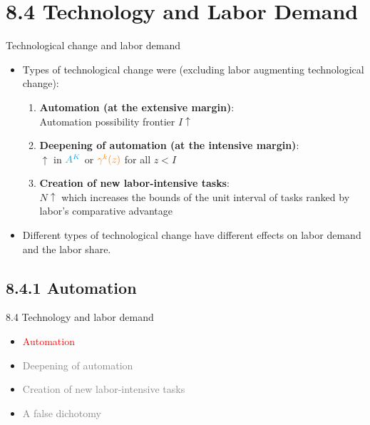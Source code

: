\documentclass[notes=show]{beamer}
\begin{document}
\section{8.4 Technology and Labor Demand}

\begin{frame}{Technological change and labor demand}
\begin{itemize}
\item Types of technological change were (excluding labor augmenting technological change): \medskip
\begin{enumerate}
\item \textbf{Automation (at the extensive margin)}: \\
Automation possibility frontier $I \uparrow $ \medskip
\item \textbf{Deepening of automation (at the intensive margin)}: \\
$\uparrow$ in $\color{cyan} A^{K}$ or $\color{orange} \gamma^{k}(z)$ for all $z < I$ \medskip
\item \textbf{Creation of new labor-intensive tasks}: \\
$N \uparrow $ which increases the bounds of the unit interval of tasks ranked by labor's comparative advantage \smallskip
\end{enumerate}
\item Different types of technological change have different effects on labor demand and the labor share.
\end{itemize}
\end{frame}

\subsection{8.4.1 Automation}

\begin{frame}{8.4 Technology and labor demand}
\begin{itemize}
\item[\textcolor{red}{8.4.1}] \textcolor{red}{Automation} \medskip
\item[\textcolor{gray}{8.4.2}] \textcolor{gray}{Deepening of automation} \medskip
\item[\textcolor{gray}{8.4.3}] \textcolor{gray}{Creation of new labor-intensive tasks} \medskip
\item[\textcolor{gray}{8.4.4}] \textcolor{gray}{A false dichotomy}
\end{itemize}
\end{frame}
\end{document}
